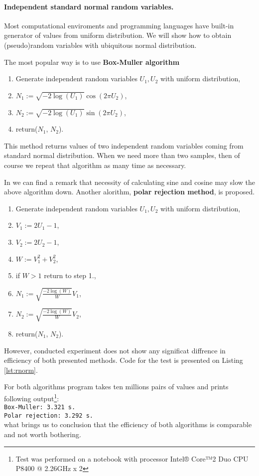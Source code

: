 \documentclass[a4paper,12pt, oneside]{book}
\theoremstyle{definition}
\theoremstyle{remark}
\begin{document}
\paragraph{Independent standard normal random variables.} Most computational enviroments and programming languages have built-in generator of values from uniform distribution. We will show how to obtain (pseudo)random variables with ubiquitous normal distribution.

The most popular way is to use \textbf{Box-Muller algorithm}
\begin{enumerate}
 \item Generate independent random variables $U_1, U_2$ with uniform distribution,
 \item $N_1 := \sqrt{-2\log(U_1)} \cos(2\pi U_2)$,
 \item $N_2 := \sqrt{-2\log(U_1)} \sin(2\pi U_2)$,
 \item return($N_1$, $N_2$).
\end{enumerate}
This method returns values of two independent random variables coming from standard normal distribution. When we need more than two samples, then of course we repeat that algorithm as many time as necessary.

In \cite{london} we can find a remark that necessity of calculating sine and cosine may slow the above algorithm down. Another alorithm, \textbf{polar rejection method}, is proposed.
\begin{enumerate}
 \item Generate independent random variables $U_1, U_2$ with uniform distribution,
 \item $V_1 := 2U_1-1$,
 \item $V_2 := 2U_2-1$,
 \item $W := V_1^2 + V_2^2$,
 \item if $W > 1$ return to step 1.,
 \item $N_1 := \sqrt{\frac{-2\log(W)}{W}} V_1$,
 \item $N_2 := \sqrt{\frac{-2\log(W)}{W}} V_2$,
 \item return($N_1$, $N_2$).
\end{enumerate}

However, conducted experiment does not show any significat diffrence in efficiency of both presented methods. Code for the test is presented on Listing \ref{lst:rnorm}.
\lstset{  basicstyle=\scriptsize }

For both algorithms program takes ten millions pairs of values and prints following \hbox{output}\footnote{Test was performed on a notebook with processor Intel® Core™2 Duo CPU P8400 @ 2.26GHz x 2 }: \bigskip \\
\texttt{Box-Muller: 3.321 s.\\
Polar rejection: 3.292 s.} \bigskip\\
what brings us to conclusion that the efficiency of both algorithms is comparable and not worth bothering.
\end{document}
